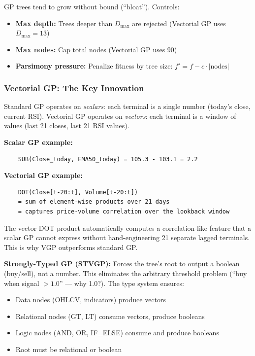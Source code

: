 \documentclass[11pt,a4paper]{article}
\begin{document}
GP trees tend to grow without bound (``bloat''). Controls:
\begin{itemize}
    \item \textbf{Max depth:} Trees deeper than $D_{\max}$ are rejected (Vectorial GP uses $D_{\max} = 13$)
    \item \textbf{Max nodes:} Cap total nodes (Vectorial GP uses 90)
    \item \textbf{Parsimony pressure:} Penalize fitness by tree size: $f' = f - c \cdot |\text{nodes}|$
\end{itemize}

\subsubsection{Vectorial GP: The Key Innovation}

Standard GP operates on \textit{scalars}: each terminal is a single number (today's close, current RSI). Vectorial GP operates on \textit{vectors}: each terminal is a window of values (last 21 closes, last 21 RSI values).

\textbf{Scalar GP example:}
\begin{verbatim}
    SUB(Close_today, EMA50_today) = 105.3 - 103.1 = 2.2
\end{verbatim}

\textbf{Vectorial GP example:}
\begin{verbatim}
    DOT(Close[t-20:t], Volume[t-20:t])
    = sum of element-wise products over 21 days
    = captures price-volume correlation over the lookback window
\end{verbatim}

The vector DOT product automatically computes a correlation-like feature that a scalar GP cannot express without hand-engineering 21 separate lagged terminals. This is why VGP outperforms standard GP.

\textbf{Strongly-Typed GP (STVGP):} Forces the tree's root to output a boolean (buy/sell), not a number. This eliminates the arbitrary threshold problem (``buy when signal $> 1.0$'' --- why 1.0?). The type system ensures:
\begin{itemize}
    \item Data nodes (OHLCV, indicators) produce vectors
    \item Relational nodes (GT, LT) consume vectors, produce booleans
    \item Logic nodes (AND, OR, IF\_ELSE) consume and produce booleans
    \item Root must be relational or boolean
\end{itemize}
\end{document}
